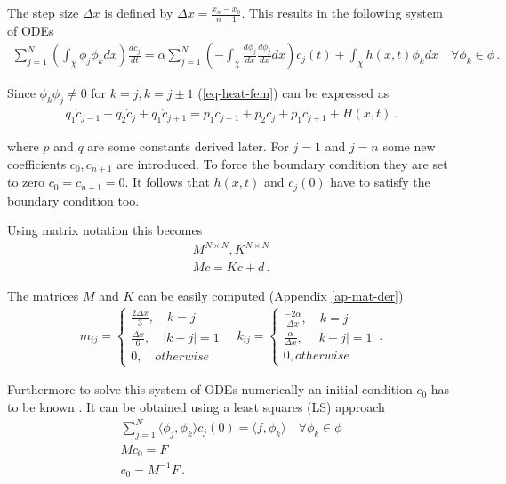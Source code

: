 The step size \(\Delta x\) is defined by \(\Delta x = \frac{x_n - x_0}{n-1}\). \label{def-delta-x}
This results in the following system of ODEs
\begin{gather}
\sum_{j=1}^N\left(\int_{\chi} \phi_{j}\phi_{k}dx\right)\frac{dc_{j}}{dt} = \alpha \sum_{j = 1}^N\left(-\int_{\chi} \frac{d\phi_{j}}{dx}\frac{d\phi_{j}}{dx}dx\right)c_{j}(t) + \int_{\chi}h(x, t) \phi_{k} dx
\quad \forall \phi_{k} \in \phi \,. \label{eq-heat-fem}
\end{gather}


Since \(\phi_k \phi_j \neq 0\) for \(k = j, k = j \pm 1\) (\ref{eq-heat-fem}) 
can be expressed as 
\begin{gather}
q_1\dot{c}_{j-1} + q_2 \dot{c}_{j} + q_1 \dot{c}_{j+1} = p_1 c_{j-1} + p_2 c_{j} + p_1 c_{j+1} + H(x,t) \,.
\end{gather}


where \(p\) and \(q\) are some constants derived later.
For \(j=1\)  and \(j=n\) some new coefficients \(c_0, c_{n+1}\) are introduced.
To force the boundary condition they are set to zero \(c_0 = c_{n+1} = 0\).
It follows that \(h(x, t)\) and \(c_j(0)\) have to satisfy the boundary condition too.

Using matrix notation this becomes
\begin{gather}
M^{N \times N}, K^{N \times N} \\
M\dot{c} = Kc + d \,. \label{eq-heat-almost-ss}
\end{gather}


The matrices \(M\) and \(K\) can be easily computed (Appendix \ref{ap-mat-der})
\begin{gather}
m_{ij} = \begin{cases}
\frac{2\Delta x}{3}, \quad k = j \\
\frac{\Delta x}{6}, \quad |k - j| = 1 \\
0, \quad otherwise 
\end{cases} \label{def-mat-a}
\quad
k_{ij} = \begin{cases}
\frac{-2\alpha}{\Delta x}, \quad k = j \\
\frac{\alpha}{\Delta x}, \quad |k - j| = 1 \\
0, otherwise
\end{cases}\,.
\end{gather}


Furthermore to solve this system of ODEs numerically an initial condition \(c_{0}\) has to be known 
\cite{Gustafsson2011b}.
It can be obtained using a least squares (LS) approach \cite{Gustafsson2011c}
\begin{gather}
\sum_{j = 1}^N \langle \phi_j, \phi_k \rangle c_{j}(0) = \langle f, \phi_{k} \rangle \quad \forall \phi_k \in \phi \\
Mc_{0} = F \label{F}\\ 
c_{0} = M^{-1}F \,. \label{c0}
\end{gather}



